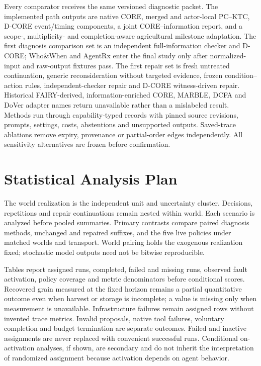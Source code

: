 \documentclass[sigconf,anonymous]{aamas}
\begin{document}
Every comparator receives the same versioned diagnostic packet. The implemented path outputs are native CORE, merged and actor-local PC--KTC, D-CORE event/timing components, a joint CORE--information report, and a scope-, multiplicity- and completion-aware agricultural milestone adaptation. The first diagnosis comparison set is an independent full-information checker and D-CORE; Who\&When and AgentRx enter the final study only after normalized-input and raw-output fixtures pass. The first repair set is fresh untreated continuation, generic reconsideration without targeted evidence, frozen condition--action rules, independent-checker repair and D-CORE witness-driven repair. Historical FAIRY-derived, information-enriched CORE, MARBLE, DCFA and DoVer adapter names return unavailable rather than a mislabeled result. Methods run through capability-typed records with pinned source revisions, prompts, settings, costs, abstentions and unsupported outputs. Saved-trace ablations remove expiry, provenance or partial-order edges independently. All sensitivity alternatives are frozen before confirmation.

\section{Statistical Analysis Plan}
The world realization is the independent unit and uncertainty cluster. Decisions, repetitions and repair continuations remain nested within world. Each scenario is analyzed before pooled summaries. Primary contrasts compare paired diagnosis methods, unchanged and repaired suffixes, and the five live policies under matched worlds and transport. World pairing holds the exogenous realization fixed; stochastic model outputs need not be bitwise reproducible.

Tables report assigned runs, completed, failed and missing runs, observed fault activation, policy coverage and metric denominators before conditional scores. Recovered grain measured at the fixed horizon remains a partial quantitative outcome even when harvest or storage is incomplete; a value is missing only when measurement is unavailable. Infrastructure failures remain assigned rows without invented trace metrics. Invalid proposals, native tool failures, voluntary completion and budget termination are separate outcomes. Failed and inactive assignments are never replaced with convenient successful runs. Conditional on-activation analyses, if shown, are secondary and do not inherit the interpretation of randomized assignment because activation depends on agent behavior.
\end{document}
